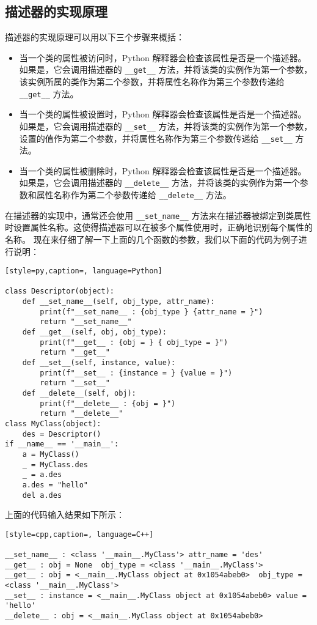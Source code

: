 \subsection{描述器的实现原理}
描述器的实现原理可以用以下三个步骤来概括：
\begin{itemize}
\item 当一个类的属性被访问时，Python 解释器会检查该属性是否是一个描述器。如果是，它会调用描述器的 \verb|__get__| 方法，并将该类的实例作为第一个参数，该实例所属的类作为第二个参数，并将属性名称作为第三个参数传递给 \verb|__get__| 方法。 
\item 当一个类的属性被设置时，Python 解释器会检查该属性是否是一个描述器。如果是，它会调用描述器的 \verb|__set__| 方法，并将该类的实例作为第一个参数，设置的值作为第二个参数，并将属性名称作为第三个参数传递给 \verb|__set__| 方法。 
\item 当一个类的属性被删除时，Python 解释器会检查该属性是否是一个描述器。如果是，它会调用描述器的 \verb|__delete__| 方法，并将该类的实例作为第一个参数和属性名称作为第二个参数传递给 \verb|__delete__| 方法。 
\end{itemize}
在描述器的实现中，通常还会使用 \verb|__set_name__| 方法来在描述器被绑定到类属性时设置属性名称。这使得描述器可以在被多个属性使用时，正确地识别每个属性的名称。
现在来仔细了解一下上面的几个函数的参数，我们以下面的代码为例子进行说明：
\begin{lstlisting}[style=py,caption=, language=Python]

class Descriptor(object):
    def __set_name__(self, obj_type, attr_name):
        print(f"__set_name__ : {obj_type } {attr_name = }")
        return "__set_name__"
    def __get__(self, obj, obj_type):
        print(f"__get__ : {obj = } { obj_type = }")
        return "__get__"
    def __set__(self, instance, value):
        print(f"__set__ : {instance = } {value = }")
        return "__set__"
    def __delete__(self, obj):
        print(f"__delete__ : {obj = }")
        return "__delete__"
class MyClass(object):
    des = Descriptor()
if __name__ == '__main__':
    a = MyClass()
    _ = MyClass.des
    _ = a.des
    a.des = "hello"
    del a.des
\end{lstlisting}
上面的代码输入结果如下所示：
\begin{lstlisting}[style=cpp,caption=, language=C++]

__set_name__ : <class '__main__.MyClass'> attr_name = 'des'
__get__ : obj = None  obj_type = <class '__main__.MyClass'>
__get__ : obj = <__main__.MyClass object at 0x1054abeb0>  obj_type = <class '__main__.MyClass'>
__set__ : instance = <__main__.MyClass object at 0x1054abeb0> value = 'hello'
__delete__ : obj = <__main__.MyClass object at 0x1054abeb0>
\end{lstlisting}
